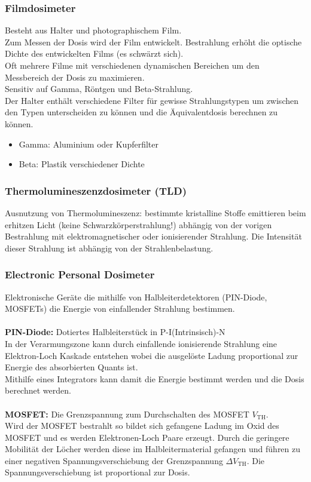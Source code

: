\documentclass[11pt, a4paper]{article}
\numberwithin{equation}{section}
\begin{document}
\subsubsection{Filmdosimeter}
Besteht aus Halter und photographischem Film.\\
Zum Messen der Dosis wird der Film entwickelt. Bestrahlung erhöht die optische Dichte des entwickelten Films (es schwärzt sich).\\
Oft mehrere Filme mit verschiedenen dynamischen Bereichen um den Messbereich der Dosis zu maximieren.\\
Sensitiv auf Gamma, Röntgen und Beta-Strahlung.\\
Der Halter enthält verschiedene Filter für gewisse Strahlungstypen um zwischen den Typen unterscheiden zu können und die Äquivalentdosis berechnen zu können.\\
\begin{itemize}
	\item Gamma: Aluminium oder Kupferfilter
	\item Beta: Plastik verschiedener Dichte
\end{itemize}

\subsubsection{Thermolumineszenzdosimeter (TLD)}
Ausnutzung von Thermolumineszenz: bestimmte kristalline Stoffe emittieren beim erhitzen Licht (keine Schwarzkörperstrahlung!) abhängig von der vorigen Bestrahlung mit elektromagnetischer oder ionisierender Strahlung.
Die Intensität dieser Strahlung ist abhängig von der Strahlenbelastung.

\subsubsection{Electronic Personal Dosimeter}
Elektronische Geräte die mithilfe von Halbleiterdetektoren (PIN-Diode, MOSFETs) die Energie von einfallender Strahlung bestimmen.\\
\\
\textbf{PIN-Diode:} Dotiertes Halbleiterstück in P-I(Intrinsisch)-N\\
In der Verarmungszone kann durch einfallende ionisierende Strahlung eine Elektron-Loch Kaskade entstehen wobei die ausgelöste Ladung proportional zur Energie des absorbierten Quants ist.\\
Mithilfe eines Integrators kann damit die Energie bestimmt werden und die Dosis berechnet werden.\\
\\
\textbf{MOSFET:} Die Grenzspannung zum Durchschalten des MOSFET $V_\mathrm{TH}$.\\
Wird der MOSFET bestrahlt so bildet sich gefangene Ladung im Oxid des MOSFET und es werden Elektronen-Loch Paare erzeugt.
Durch die geringere Mobilität der Löcher werden diese im Halbleitermaterial gefangen und führen zu einer negativen Spannungsverschiebung der Grenzspannung $\Delta V_\mathrm{TH}$.
Die Spannungsverschiebung ist proportional zur Dosis.
\end{document}
